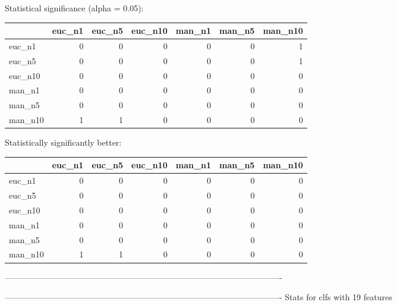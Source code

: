 Statistical significance (alpha = 0.05):
 \begin{tabular}{lrrrrrr}
\hline
         &   euc\_n1 &   euc\_n5 &   euc\_n10 &   man\_n1 &   man\_n5 &   man\_n10 \\
\hline
 euc\_n1  &        0 &        0 &         0 &        0 &        0 &         1 \\
 euc\_n5  &        0 &        0 &         0 &        0 &        0 &         1 \\
 euc\_n10 &        0 &        0 &         0 &        0 &        0 &         0 \\
 man\_n1  &        0 &        0 &         0 &        0 &        0 &         0 \\
 man\_n5  &        0 &        0 &         0 &        0 &        0 &         0 \\
 man\_n10 &        1 &        1 &         0 &        0 &        0 &         0 \\
\hline
\end{tabular} 

Statistically significantly better:
 \begin{tabular}{lrrrrrr}
\hline
         &   euc\_n1 &   euc\_n5 &   euc\_n10 &   man\_n1 &   man\_n5 &   man\_n10 \\
\hline
 euc\_n1  &        0 &        0 &         0 &        0 &        0 &         0 \\
 euc\_n5  &        0 &        0 &         0 &        0 &        0 &         0 \\
 euc\_n10 &        0 &        0 &         0 &        0 &        0 &         0 \\
 man\_n1  &        0 &        0 &         0 &        0 &        0 &         0 \\
 man\_n5  &        0 &        0 &         0 &        0 &        0 &         0 \\
 man\_n10 &        1 &        1 &         0 &        0 &        0 &         0 \\
\hline
\end{tabular} 

----------------------------------------------------------------------------------------------------



----------------------------------------------------------------------------------------------------
Stats for clfs with 19 features



